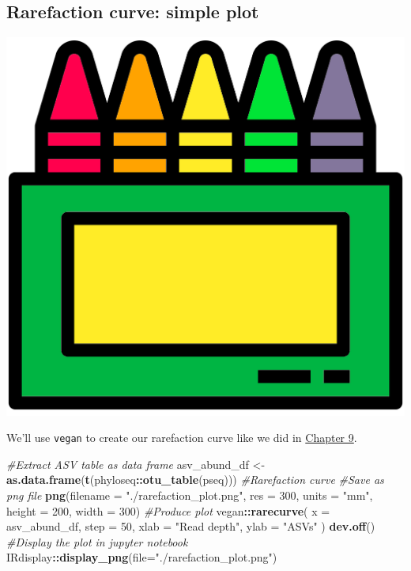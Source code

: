 \documentclass[
]{book}
\newenvironment{Shaded}{\begin{snugshade}}{\end{snugshade}}
\newcommand{\AttributeTok}[1]{\textcolor[rgb]{0.13,0.29,0.53}{#1}}
\newcommand{\CommentTok}[1]{\textcolor[rgb]{0.56,0.35,0.01}{\textit{#1}}}
\newcommand{\DecValTok}[1]{\textcolor[rgb]{0.00,0.00,0.81}{#1}}
\newcommand{\FunctionTok}[1]{\textcolor[rgb]{0.13,0.29,0.53}{\textbf{#1}}}
\newcommand{\NormalTok}[1]{#1}
\newcommand{\OtherTok}[1]{\textcolor[rgb]{0.56,0.35,0.01}{#1}}
\newcommand{\SpecialCharTok}[1]{\textcolor[rgb]{0.81,0.36,0.00}{\textbf{#1}}}
\newcommand{\StringTok}[1]{\textcolor[rgb]{0.31,0.60,0.02}{#1}}
\begin{document}
\hypertarget{rarefaction-curve-simple-plot}{%
\subsection{Rarefaction curve: simple plot}\label{rarefaction-curve-simple-plot}}

\includegraphics{figures/crayon.png}

We'll use \texttt{vegan} to create our rarefaction curve like we did in
\protect\hyperlink{chap9rarefaction}{Chapter 9}.

\begin{Shaded}
\begin{Highlighting}[]
\CommentTok{\#Extract ASV table as data frame}
\NormalTok{asv\_abund\_df }\OtherTok{\textless{}{-}} \FunctionTok{as.data.frame}\NormalTok{(}\FunctionTok{t}\NormalTok{(phyloseq}\SpecialCharTok{::}\FunctionTok{otu\_table}\NormalTok{(pseq)))}
\CommentTok{\#Rarefaction curve}
\CommentTok{\#Save as png file}
\FunctionTok{png}\NormalTok{(}\AttributeTok{filename =} \StringTok{"./rarefaction\_plot.png"}\NormalTok{, }\AttributeTok{res =} \DecValTok{300}\NormalTok{,}
    \AttributeTok{units =} \StringTok{"mm"}\NormalTok{, }\AttributeTok{height =} \DecValTok{200}\NormalTok{, }\AttributeTok{width =} \DecValTok{300}\NormalTok{)}
\CommentTok{\#Produce plot}
\NormalTok{vegan}\SpecialCharTok{::}\FunctionTok{rarecurve}\NormalTok{(}
  \AttributeTok{x =}\NormalTok{ asv\_abund\_df, }\AttributeTok{step =} \DecValTok{50}\NormalTok{,}
  \AttributeTok{xlab =} \StringTok{"Read depth"}\NormalTok{,}
  \AttributeTok{ylab =} \StringTok{"ASVs"}
\NormalTok{)}
\FunctionTok{dev.off}\NormalTok{()}
\CommentTok{\#Display the plot in jupyter notebook}
\NormalTok{IRdisplay}\SpecialCharTok{::}\FunctionTok{display\_png}\NormalTok{(}\AttributeTok{file=}\StringTok{"./rarefaction\_plot.png"}\NormalTok{)}
\end{Highlighting}
\end{Shaded}
\end{document}
